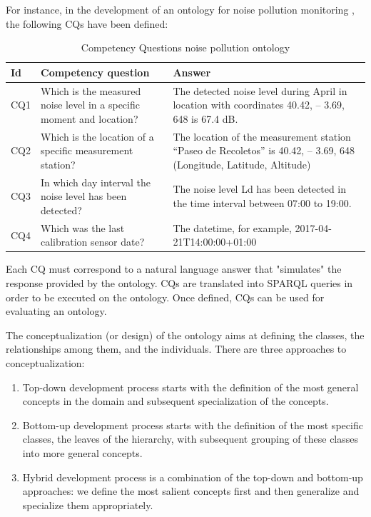 For instance, in the development of an ontology for noise pollution monitoring \cite{espinoza2020using}, the following CQs have been defined:
\begin{table}[H]
    \centering
    \begin{tabular}{|>{\raggedright\arraybackslash}p{1cm}|>{\raggedright\arraybackslash}p{6cm}|>{\raggedright\arraybackslash}p{6cm}|}
        \hline
        Id & Competency question & Answer \\ \hline
        CQ1 & Which is the measured noise level in a specific moment and location? & The detected noise level during April in location with coordinates 40.42, – 3.69, 648 is 67.4 dB. \\ \hline
        CQ2 & Which is the location of a specific measurement station? & The location of the measurement station “Paseo de Recoletos” is 40.42, – 3.69, 648 (Longitude, Latitude, Altitude) \\ \hline
        CQ3 & In which day interval the noise level has been detected? & The noise level Ld has been detected in the time interval between 07:00 to 19:00. \\ \hline
        CQ4 & Which was the last calibration sensor date? & The datetime, for example, 2017-04-21T14:00:00+01:00 \\ \hline
    \end{tabular}
    \caption{Competency Questions noise pollution ontology}
\end{table}
Each CQ must correspond to a natural language answer that "simulates" the response provided by the ontology.
CQs are translated into SPARQL queries in order to be executed on the ontology.
Once defined, CQs can be used for evaluating an ontology.

The conceptualization (or design) of the ontology aims at defining the classes, the relationships among them, and the individuals.
There are three approaches to conceptualization:
\begin{enumerate}
    \item Top-down development process starts with the definition of the most general concepts in the domain and subsequent specialization of the concepts.
    \item Bottom-up development process starts with the definition of the most specific classes, the leaves of the hierarchy, with subsequent grouping of these classes into more general concepts.
    \item Hybrid development process is a combination of the top-down and bottom-up approaches: we define the most salient concepts first and then generalize and specialize them appropriately.
\end{enumerate}


